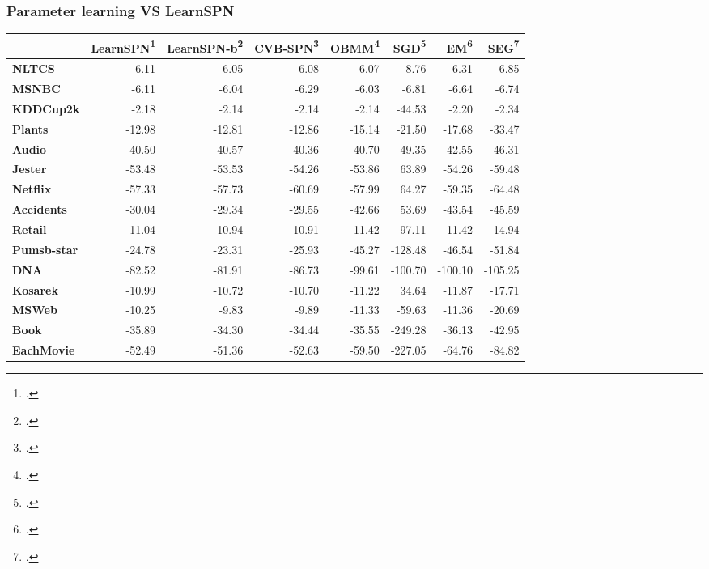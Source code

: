 \documentclass[10pt, t, xcolor={usenames,dvipsnames,svgnames}, compress]{beamer}
\begin{document}
\begin{frame}[t]
  \frametitle{Parameter learning VS LearnSPN}
  \begin{table}
    \centering
    \scriptsize
    \setlength{\tabcolsep}{3pt}  
    \begin{tabular}{l r r r r r r r}
      \toprule
      & \textsf{LearnSPN}\footcite{Gens2013} & \textsf{LearnSPN-b}\footcite{Vergari2015} & \textsf{CVB-SPN}\footcite{Zhao2016a} & \textsf{OBMM}\footcite{Rashwan2016} & \textsf{SGD}\footcite{Rashwan2016} & \textsf{EM}\footcite{Rashwan2016} & \textsf{SEG}\footcite{Rashwan2016} \\
      \midrule
      \textbf{NLTCS}      & -6.11   & -6.05   & -6.08   & -6.07   & -8.76   & -6.31   & -6.85   \\
      \textbf{MSNBC}      & -6.11   & -6.04   & -6.29   & -6.03   & -6.81   & -6.64   & -6.74   \\
      \textbf{KDDCup2k}   & -2.18   & -2.14   & -2.14   & -2.14   & -44.53  & -2.20   & -2.34   \\
      \textbf{Plants}     & -12.98  & -12.81  & -12.86  & -15.14  & -21.50  & -17.68  & -33.47  \\
      \textbf{Audio}      & -40.50  & -40.57  & -40.36  & -40.70  & -49.35  & -42.55  & -46.31  \\
      \textbf{Jester}     & -53.48  & -53.53  & -54.26  & -53.86  & 63.89   & -54.26  & -59.48  \\
      \textbf{Netflix}    & -57.33  & -57.73  & -60.69  & -57.99  & 64.27   & -59.35  & -64.48  \\
      \textbf{Accidents}  & -30.04  & -29.34  & -29.55  & -42.66  & 53.69   & -43.54  & -45.59  \\
      \textbf{Retail}     & -11.04  & -10.94  & -10.91  & -11.42  & -97.11  & -11.42  & -14.94  \\
      \textbf{Pumsb-star} & -24.78  & -23.31  & -25.93  & -45.27  & -128.48 & -46.54  & -51.84  \\
      \textbf{DNA}        & -82.52  & -81.91  & -86.73  & -99.61  & -100.70 & -100.10 & -105.25 \\
      \textbf{Kosarek}    & -10.99  & -10.72  & -10.70  & -11.22  & 34.64   & -11.87  & -17.71  \\
      \textbf{MSWeb}      & -10.25  & -9.83   & -9.89   & -11.33  & -59.63  & -11.36  & -20.69  \\
      \textbf{Book}       & -35.89  & -34.30  & -34.44  & -35.55  & -249.28 & -36.13  & -42.95  \\
      \textbf{EachMovie}  & -52.49  & -51.36  & -52.63  & -59.50  & -227.05 & -64.76  & -84.82  \\

\end{tabular}
\end{table}
\end{frame}
\end{document}
